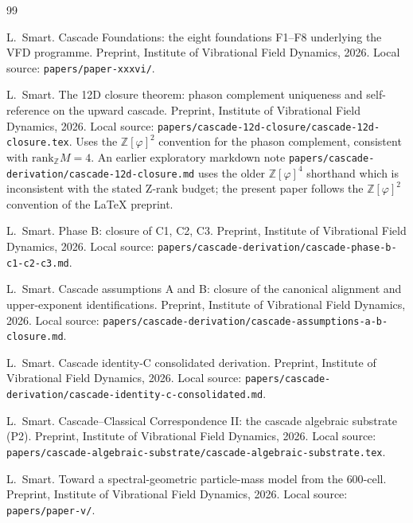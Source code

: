 \documentclass[12pt]{article}
\theoremstyle{definition}
\theoremstyle{remark}
\newcommand{\Z}{\mathbb{Z}}
\newcommand{\Zphi}{\mathbb{Z}[\varphi]}
\begin{document}

\begin{thebibliography}{99}

L.~Smart.
\newblock Cascade Foundations: the eight foundations F1--F8 underlying the {VFD} programme.
\newblock Preprint, Institute of Vibrational Field Dynamics, 2026.
\newblock Local source: \texttt{papers/paper-xxxvi/}.

L.~Smart.
\newblock The {12D} closure theorem: phason complement uniqueness and self-reference on the upward cascade.
\newblock Preprint, Institute of Vibrational Field Dynamics, 2026.
\newblock Local source: \texttt{papers/cascade-12d-closure/cascade-12d-closure.tex}. Uses the $\Zphi^2$ convention for the phason complement, consistent with $\mathrm{rank}_\Z M = 4$. An earlier exploratory markdown note \texttt{papers/cascade-derivation/cascade-12d-closure.md} uses the older $\Zphi^4$ shorthand which is inconsistent with the stated Z-rank budget; the present paper follows the $\Zphi^2$ convention of the LaTeX preprint.

L.~Smart.
\newblock Phase {B}: closure of {C1, C2, C3}.
\newblock Preprint, Institute of Vibrational Field Dynamics, 2026.
\newblock Local source: \texttt{papers/cascade-derivation/cascade-phase-b-c1-c2-c3.md}.

L.~Smart.
\newblock Cascade assumptions {A} and {B}: closure of the canonical alignment and upper-exponent identifications.
\newblock Preprint, Institute of Vibrational Field Dynamics, 2026.
\newblock Local source: \texttt{papers/cascade-derivation/cascade-assumptions-a-b-closure.md}.

L.~Smart.
\newblock Cascade identity-{C} consolidated derivation.
\newblock Preprint, Institute of Vibrational Field Dynamics, 2026.
\newblock Local source: \texttt{papers/cascade-derivation/cascade-identity-c-consolidated.md}.

L.~Smart.
\newblock Cascade--Classical Correspondence II: the cascade algebraic substrate ({P2}).
\newblock Preprint, Institute of Vibrational Field Dynamics, 2026.
\newblock Local source: \texttt{papers/cascade-algebraic-substrate/cascade-algebraic-substrate.tex}.

L.~Smart.
\newblock Toward a spectral-geometric particle-mass model from the {600}-cell.
\newblock Preprint, Institute of Vibrational Field Dynamics, 2026.
\newblock Local source: \texttt{papers/paper-v/}.


\end{thebibliography}
\end{document}
